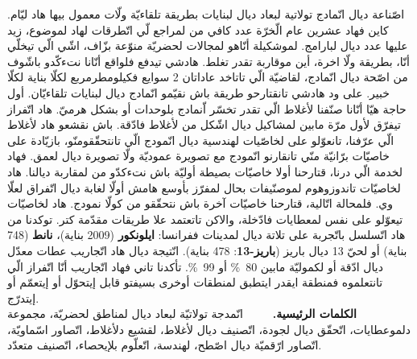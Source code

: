 اصّناعة ديال انّمادج تولاتية لبعاد ديال لبنايات بطريقة تلقاءيّة ولّات معمول بيها هاد ليّام.
كاين فهاد عشرين عام الّخرّة عدد كافي من لمراجع لّي اتّطرقات لهاد لموضوع، زيد عليها عدد ديال لبارامج.
لموشكيلة أنّاهو لمجالات لحضريّة منوّعة بزّاف، اشّي الّي تيخلّي أنّا، بطريقة ولّا اخرة، أين موقاربة تقدر تغلط.
هادشي تيدفع فلواقع أنّانا نتءكّدو باشّوف من اصّحة ديال انّمادج، لقاضيّة الّي تاتاخد عاداتان 2 سوايع فكيلومطرمربع لكلّا بناية لكلّا خبير.
على ود هادشي تانقتارحو طريقة باش نقيّمو انّمادج ديال لبنايات تلقاءيّان.
أول حاجة هيّا أنّانا صنّفنا لأغلاط الّي تقدر تخسّر اّنمادج بلوحدات أو بشكل هرميّ.
هاد اتّفراز تيفرّق لأول مرّة مابين لمشاكيل ديال اشّكل من لأغلاط فادّقة.
باش نقشعو هاد لأغلاط الّي عرّفنا، تانعوّلو على لخاصّيات لهندسية ديال انّمودج الّي تانتحقّقومنّو، بازيّادة على خاصيّات برّانيّة منّي تانقارنو انّمودج مع تصويرة عموديّة ولّا تصويرة ديال لعمق.
فهاد لخدمة الّي درنا، قتارحنا أولا خاصيّات بصيطة أوليّة باش نتءكدّو من لمقاربة ديالنا.
هاد لخاصيّات تاندوزوهوم لموصنّيفات بحال لمفرّز بأوسع هامش أولّا لغابة ديال اتّفراق لعلّا وي.
فلمحالة اتّالية، قتارحنا خاصيّات آخرة باش نتحقّقو من كولّا نمودج.
هاد لخاصيّات تيعوّلو على نفس لمعطايات فادّخلة، والاكن تاتعتمد علا طريقات مقدّمة كتر.
توكدنا من هاد اتّسلسل باتّجربة على تلاتة ديال لمدينات ففرانسا: \textbf{ايلونكور} (2009 بناية)، \textbf{نانط} (748 بناية) أو لحيّ 13 ديال باريز (\textbf{باريز-13}: 478 بناية).
انّتيجة ديال هاد اتّجاريب عطات معدّل ديال ادّقة أو لكموليّة مابين \SI{80}{\percent} أو \SI{99}{\percent}.
تأكدنا تاني فهاد اتّجاريب أنّا اتّفراز الّي تانتعلموه فمنطقة ايقدر ايتطبق لمنطقات أوخرى بسيفتو قابل إيتحوّل أو إيتعمّم أو إيتدرّج.\\

\textbf{الكلمات الرئيسية.~\ ~\ } انّمدجة تولاتيّة لبعاد ديال لمناطق لحضريّة، مجموعة دلموعطايات، اتّحقّق ديال لجودة، اتّصنيف ديال لأغلاط، لقشيع دلأغلاط، اتّصاور اسّماويّة، اتّصاور ارّقميّة ديال اصّطح، لهندسة، اتّعلّوم بلإيحصاء، اتّصنيف متعدّد.
